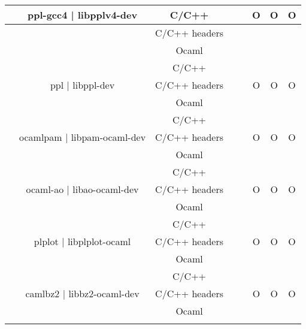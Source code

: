 \documentclass[11pt,a4paper]{article}
\begin{document}
\begin{table}[h,t]
\begin{tabular}{|>{\centering}m{3cm}| c|c|r|r| c| c|c|}
 &\multirow{3}{3cm}{ppl-gcc4 | libpplv4-dev} & C/C++ &  &  & \multirow{3}{*}{O} & \multirow{3}{*}{O} & \multirow{3}{*}{O}\\
 \cline{3-5}
 & &                           C/C++ headers &  &  & & & \\
 \cline{3-5}
 & &                          Ocaml &  &  & & & \\
 \cline{2-8}


 &\multirow{3}{*}{ppl | libppl-dev} & C/C++ &  &  & \multirow{3}{*}{O} & \multirow{3}{*}{O} & \multirow{3}{*}{O}\\
 \cline{3-5}
 & &                           C/C++ headers &  &  & & & \\
 \cline{3-5}
 & &                          Ocaml &  &  & & & \\
 \cline{2-8}


 &\multirow{3}{3cm}{ocamlpam | libpam-ocaml-dev} & C/C++ &  &  & \multirow{3}{*}{O} & \multirow{3}{*}{O} & \multirow{3}{*}{O}\\
 \cline{3-5}
 & &                           C/C++ headers &  &  & & & \\
 \cline{3-5}
 & &                          Ocaml &  &  & & & \\
 \cline{2-8}


 &\multirow{3}{3cm}{ocaml-ao | libao-ocaml-dev} & C/C++ &  &  & \multirow{3}{*}{O} & \multirow{3}{*}{O} & \multirow{3}{*}{O}\\
 \cline{3-5}
 & &                           C/C++ headers &  &  & & & \\
 \cline{3-5}
 & &                          Ocaml &  &  & & & \\
 \cline{2-8}


 &\multirow{3}{3cm}{plplot | libplplot-ocaml} & C/C++ &  &  & \multirow{3}{*}{O} & \multirow{3}{*}{O} & \multirow{3}{*}{O}\\
 \cline{3-5}
 & &                           C/C++ headers &  &  & & & \\
 \cline{3-5}
 & &                          Ocaml &  &  & & & \\
 \cline{2-8}


 &\multirow{3}{3cm}{camlbz2 | libbz2-ocaml-dev} & C/C++ &  &  & \multirow{3}{*}{O} & \multirow{3}{*}{O} & \multirow{3}{*}{O}\\
 \cline{3-5}
 & &                           C/C++ headers &  &  & & & \\
 \cline{3-5}
 & &                          Ocaml &  &  & & & \\
 \cline{2-8}



\end{tabular}
\end{table}
\end{document}
